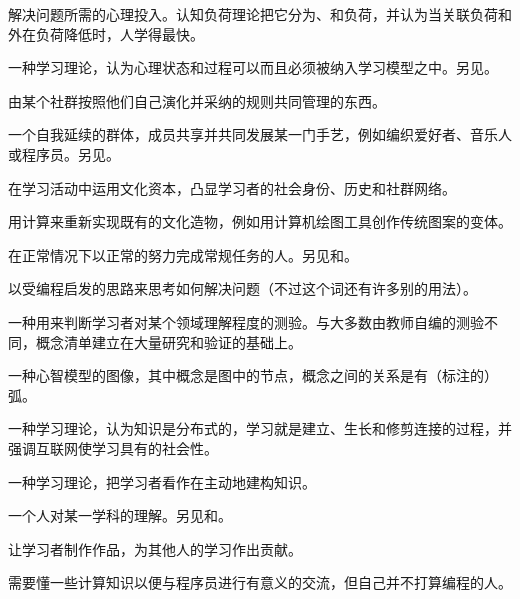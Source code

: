 \begin{description}
 解决问题所需的心理投入。认知负荷理论把它分为、和负荷，并认为当关联负荷和外在负荷降低时，人学得最快。

 一种学习理论，认为心理状态和过程可以而且必须被纳入学习模型之中。另见。

 由某个社群按照他们自己演化并采纳的规则共同管理的东西。

 一个自我延续的群体，成员共享并共同发展某一门手艺，例如编织爱好者、音乐人或程序员。另见。

 在学习活动中运用文化资本，凸显学习者的社会身份、历史和社群网络。

 用计算来重新实现既有的文化造物，例如用计算机绘图工具创作传统图案的变体。

 在正常情况下以正常的努力完成常规任务的人。另见和。

 以受编程启发的思路来思考如何解决问题（不过这个词还有许多别的用法）。

 一种用来判断学习者对某个领域理解程度的测验。与大多数由教师自编的测验不同，概念清单建立在大量研究和验证的基础上。

 一种心智模型的图像，其中概念是图中的节点，概念之间的关系是有（标注的）弧。

 一种学习理论，认为知识是分布式的，学习就是建立、生长和修剪连接的过程，并强调互联网使学习具有的社会性。

 一种学习理论，把学习者看作在主动地建构知识。

 一个人对某一学科的理解。另见和。

 让学习者制作作品，为其他人的学习作出贡献。

 需要懂一些计算知识以便与程序员进行有意义的交流，但自己并不打算编程的人。


\end{description}
